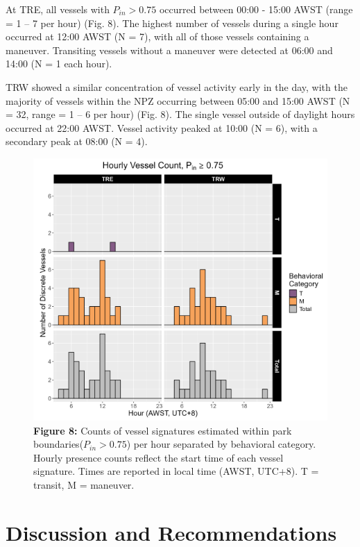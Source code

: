 \documentclass[
  letterpaper,
  oneside,
  open=any]{scrbook}
\begin{document}
At TRE, all vessels with \(P_{in} > 0.75\) occurred between 00:00 -
15:00 AWST (range = 1 -- 7 per hour) (Fig. 8). The highest number of
vessels during a single hour occurred at 12:00 AWST (N = 7), with all of
those vessels containing a maneuver. Transiting vessels without a
maneuver were detected at 06:00 and 14:00 (N = 1 each hour).

TRW showed a similar concentration of vessel activity early in the day,
with the majority of vessels within the NPZ occurring between 05:00 and
15:00 AWST (N = 32, range = 1 -- 6 per hour) (Fig. 8). The single vessel
outside of daylight hours occurred at 22:00 AWST. Vessel activity peaked
at 10:00 (N = 6), with a secondary peak at 08:00 (N = 4).

\begin{figure}[H]

{\centering \includegraphics{images/Figure.8.PNG}

}

\caption{\textbf{Figure 8:} Counts of vessel signatures estimated within
park boundaries(\(P_{in} > 0.75\)) per hour separated by behavioral
category. Hourly presence counts reflect the start time of each vessel
signature. Times are reported in local time (AWST, UTC+8). T = transit,
M = maneuver.}

\end{figure}%


\chapter{Discussion and
Recommendations}\label{discussion-and-recommendations}
\end{document}
